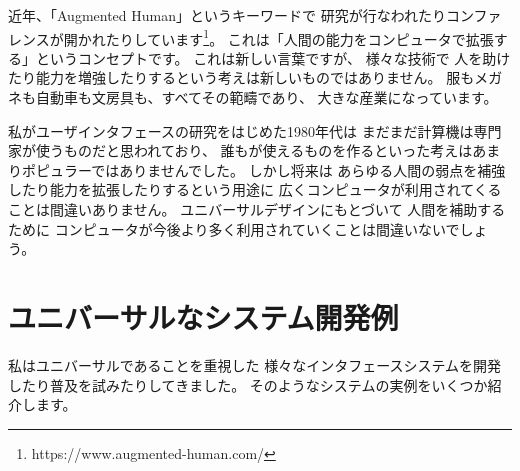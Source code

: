 \documentclass[topics]{compsoft} %
\begin{document}



近年、「Augmented Human」というキーワードで
研究が行なわれたりコンファレンスが開かれたりしています\footnote{
  \textsf{https:{\slash}{\slash}www.augmented-human.com{\slash}}
}。
これは「人間の能力をコンピュータで拡張する」というコンセプトです。
これは新しい言葉ですが、
様々な技術で
人を助けたり能力を増強したりするという考えは新しいものではありません。
服もメガネも自動車も文房具も、すべてその範疇であり、
大きな産業になっています。

私がユーザインタフェースの研究をはじめた1980年代は
まだまだ計算機は専門家が使うものだと思われており、
誰もが使えるものを作るといった考えはあまりポピュラーではありませんでした。
%
しかし将来は
あらゆる人間の弱点を補強したり能力を拡張したりするという用途に
広くコンピュータが利用されてくることは間違いありません。
ユニバーサルデザインにもとづいて
人間を補助するために
コンピュータが今後より多く利用されていくことは間違いないでしょう。

 
\section{ユニバーサルなシステム開発例}

私はユニバーサルであることを重視した
様々なインタフェースシステムを開発したり普及を試みたりしてきました。
そのようなシステムの実例をいくつか紹介します。
\end{document}
